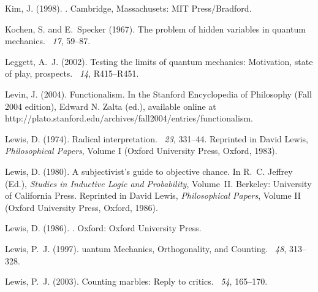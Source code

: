 \documentclass[12pt]{article}
\begin{document}
\begin{thebibliography}{}
Kim, J. (1998).
.
\newblock Cambridge, Massachusets: MIT Press/Bradford.

Kochen, S. and E.~Specker (1967).
\newblock The problem of hidden variables in quantum mechanics.
~{\em 17}, 59--87.

Leggett, A.~J. (2002).
\newblock Testing the limits of quantum mechanics: Motivation, state of play,
  prospects.
~{\em 14}, R415--R451.

Levin, J. (2004).
\newblock Functionalism.
\newblock In the Stanford Encyclopedia of Philosophy (Fall 2004 edition),
  Edward N. Zalta (ed.), available online at
  http://plato.stanford.edu/archives/fall2004/entries/functionalism.

Lewis, D. (1974).
\newblock Radical interpretation.
~{\em 23}, 331--44.
\newblock Reprinted in David Lewis, \textit{Philosophical Papers}, Volume I
  (Oxford University Press, Oxford, 1983).

Lewis, D. (1980).
\newblock A subjectivist's guide to objective chance.
\newblock In R.~C. Jeffrey (Ed.), {\em Studies in Inductive Logic and
  Probability}, Volume~II. Berkeley: University of California Press.
\newblock Reprinted in David Lewis, \textit{Philosophical Papers}, Volume II
  (Oxford University Press, Oxford, 1986).

Lewis, D. (1986).
.
\newblock Oxford: Oxford University Press.

Lewis, P.~J. (1997).
uantum {M}echanics, {O}rthogonality, and {C}ounting.
~{\em 48},
  313--328.

Lewis, P.~J. (2003).
\newblock Counting marbles: Reply to critics.
~{\em 54},
  165--170.


\end{thebibliography}
\end{document}
